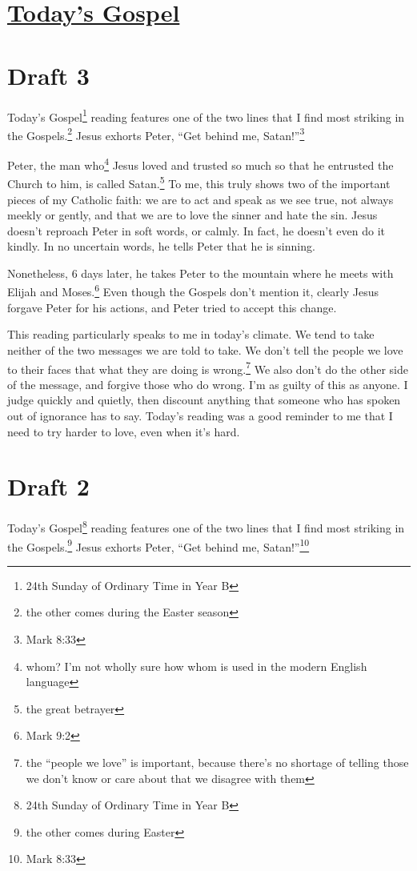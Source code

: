 \documentclass[12pt]{article}[titlepage]
\newcommand{\say}[1]{``#1''}
\newcommand{\1}{\={a}}
\newcommand{\2}{\={e}}
\newcommand{\3}{\={\i}}
\newcommand{\4}{\=o}
\newcommand{\5}{\=u}
\newcommand{\6}{\={A}}
\renewcommand{\,}{\textsuperscript{,}}
\begin{document}
\doublespacing
\section{\href{todays-gospel.html}{Today's Gospel}}

\section{Draft 3}
Today's Gospel\footnote{24th Sunday of Ordinary Time in Year B} reading features one of the two lines that I find most striking in the Gospels.\footnote{the other comes during the Easter season}
Jesus exhorts Peter, \say{Get behind me, Satan!}\footnote{Mark 8:33}

Peter, the man who\footnote{whom? I'm not wholly sure how whom is used in the modern English language} Jesus loved and trusted so much so that he entrusted the Church to him, is called Satan.\footnote{the great betrayer}
To me, this truly shows two of the important pieces of my Catholic faith: we are to act and speak as we see true, not always meekly or gently, and that we are to love the sinner and hate the sin.
Jesus doesn't reproach Peter in soft words, or calmly.
In fact, he doesn't even do it kindly.
In no uncertain words, he tells Peter that he is sinning.

Nonetheless, 6 days later, he takes Peter to the mountain where he meets with Elijah and Moses.\footnote{Mark 9:2}
Even though the Gospels don't mention it, clearly Jesus forgave Peter for his actions, and Peter tried to accept this change.

This reading particularly speaks to me in today's climate.
We tend to take neither of the two messages we are told to take.
We don't tell the people we love to their faces that what they are doing is wrong.\footnote{the \say{people we love} is important, because there's no shortage of telling those we don't know or care about that we disagree with them}
We also don't do the other side of the message, and forgive those who do wrong.
I'm as guilty of this as anyone.
I judge quickly and quietly, then discount anything that someone who has spoken out of ignorance has to say.
Today's reading was a good reminder to me that I need to try harder to love, even when it's hard.

\section{Draft 2}
Today's Gospel\footnote{24th Sunday of Ordinary Time in Year B} reading features one of the two lines that I find most striking in the Gospels.\footnote{the other comes during Easter}
Jesus exhorts Peter, \say{Get behind me, Satan!}\footnote{Mark 8:33}
\end{document}
